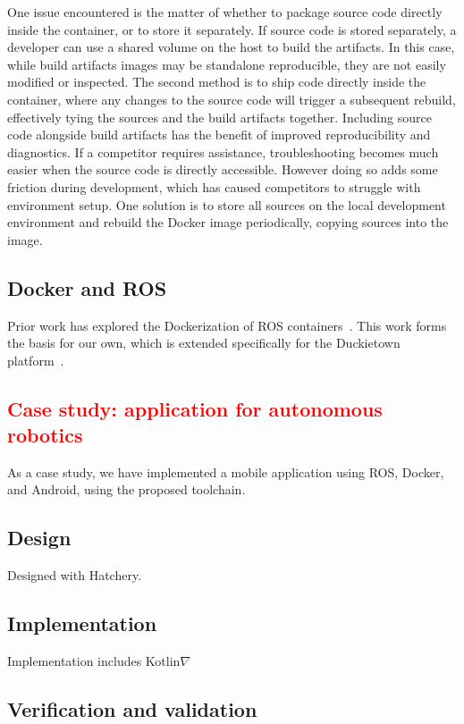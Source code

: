 \documentclass[12pt,initial,twoside,maitrise]{dms}
\newcommand{\rare}[1]{\textcolor{red}{#1}}
\numberwithin{equation}{section}
\numberwithin{table}{chapter}
\numberwithin{figure}{chapter}
\begin{document}
One issue encountered is the matter of whether to package source code directly inside the container, or to store it separately. If source code is stored separately, a developer can use a shared volume on the host to build the artifacts. In this case, while build artifacts images may be standalone reproducible, they are not easily modified or inspected. The second method is to ship code directly inside the container, where any changes to the source code will trigger a subsequent rebuild, effectively tying the sources and the build artifacts together. Including source code alongside build artifacts has the benefit of improved reproducibility and diagnostics. If a competitor requires assistance, troubleshooting becomes much easier when the source code is directly accessible. However doing so adds some friction during development, which has caused competitors to struggle with environment setup. One solution is to store all sources on the local development environment and rebuild the Docker image periodically, copying sources into the image.

\section{Docker and ROS}

Prior work has explored the Dockerization of ROS containers~\cite{white2017ros-docker}. This work forms the basis for our own, which is extended specifically for the Duckietown platform~\cite{paull2017duckietown}.

\rare{\chapter{Case study: application for autonomous robotics}}

As a case study, we have implemented a mobile application using ROS, Docker, and Android, using the proposed toolchain.

\section{Design}

Designed with Hatchery.

\section{Implementation}

Implementation includes Kotlin$\nabla$

\section{Verification and validation}
\end{document}
